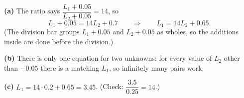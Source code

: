 \textbf{(a)} The ratio says $\dfrac{L_1+0.05}{L_2+0.05}=14$, so
\[L_1+0.05=14L_2+0.7\qquad\Longrightarrow\qquad\boxed{L_1=14L_2+0.65}.\]
(The division bar groups $L_1+0.05$ and $L_2+0.05$ as wholes, so the additions inside are done before the division.)

\textbf{(b)} There is only one equation for two unknowns: for every value of $L_2$ other than $-0.05$ there is a matching $L_1$, so infinitely many pairs work.

\textbf{(c)} $L_1=14\cdot0.2+0.65=\boxed{3.45}$. (Check: $\dfrac{3.5}{0.25}=14$.)
